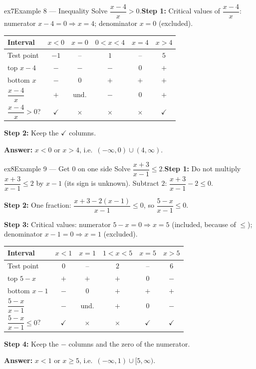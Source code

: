 \documentclass[11pt]{article}
\begin{document}
\begin{example}{ex7}{Example 8 --- Inequality}
Solve $\dfrac{x-4}{x}>0$.\soln \textbf{Step 1:} Critical values of $\dfrac{x-4}{x}$: numerator $x-4=0\Rightarrow x=4$; denominator $x=0$ (excluded).\begin{center}\small\setlength{\tabcolsep}{4pt}\renewcommand{\arraystretch}{1.2}
\begin{tabular}{l|ccccc}
\hline
Interval & $x<0$ & $x=0$ & $0<x<4$ & $x=4$ & $x>4$ \\ \hline
Test point & $-1$ & -- & $1$ & -- & $5$ \\ \hline
{\scriptsize top} $x-4$ & $-$ & $-$ & $-$ & $0$ & $+$ \\
{\scriptsize bottom} $x$ & $-$ & $0$ & $+$ & $+$ & $+$ \\
\hline
$\dfrac{x-4}{x}$ & $+$ & und. & $-$ & $0$ & $+$ \\ \hline
$\dfrac{x-4}{x}>0$? & $\checkmark$ & $\times$ & $\times$ & $\times$ & $\checkmark$ \\ \hline
\end{tabular}\end{center}\textbf{Step 2:} Keep the $\checkmark$ columns.

\textbf{Answer:} $x<0\text{ or }x>4$, i.e.\ $(-\infty,0)\cup(4,\infty)$.
\end{example}

\begin{example}{ex8}{Example 9 --- Get 0 on one side}
Solve $\dfrac{x+3}{x-1}\le2$.\soln \textbf{Step 1:} Do not multiply $\dfrac{x+3}{x-1}\le2$ by $x-1$ (its sign is unknown). Subtract $2$: $\dfrac{x+3}{x-1}-2\le0$.

\textbf{Step 2:} One fraction: $\dfrac{x+3-2(x-1)}{x-1}\le0$, so $\dfrac{5-x}{x-1}\le0$.

\textbf{Step 3:} Critical values: numerator $5-x=0\Rightarrow x=5$ (included, because of $\le$); denominator $x-1=0\Rightarrow x=1$ (excluded).\begin{center}\small\setlength{\tabcolsep}{4pt}\renewcommand{\arraystretch}{1.2}
\begin{tabular}{l|ccccc}
\hline
Interval & $x<1$ & $x=1$ & $1<x<5$ & $x=5$ & $x>5$ \\ \hline
Test point & $0$ & -- & $2$ & -- & $6$ \\ \hline
{\scriptsize top} $5-x$ & $+$ & $+$ & $+$ & $0$ & $-$ \\
{\scriptsize bottom} $x-1$ & $-$ & $0$ & $+$ & $+$ & $+$ \\
\hline
$\dfrac{5-x}{x-1}$ & $-$ & und. & $+$ & $0$ & $-$ \\ \hline
$\dfrac{5-x}{x-1}\le0$? & $\checkmark$ & $\times$ & $\times$ & $\checkmark$ & $\checkmark$ \\ \hline
\end{tabular}\end{center}\textbf{Step 4:} Keep the $-$ columns and the zero of the numerator.

\textbf{Answer:} $x<1\text{ or }x\ge5$, i.e.\ $(-\infty,1)\cup[5,\infty)$.
\end{example}
\end{document}
